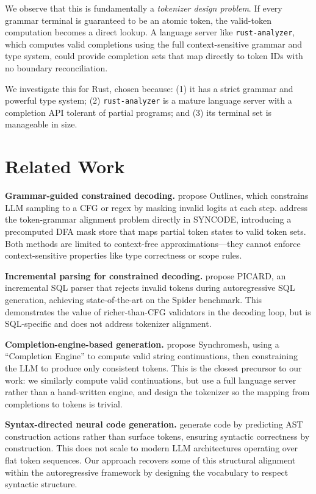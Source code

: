 \documentclass[11pt,letterpaper]{article}
\begin{document}
We observe that this is fundamentally a \emph{tokenizer design problem}. If every grammar terminal is guaranteed to be an atomic token, the valid-token computation becomes a direct lookup. A language server like \texttt{rust-analyzer}, which computes valid completions using the full context-sensitive grammar and type system, could provide completion sets that map directly to token IDs with no boundary reconciliation.

We investigate this for Rust, chosen because: (1) it has a strict grammar and powerful type system; (2) \texttt{rust-analyzer} is a mature language server with a completion API tolerant of partial programs; and (3) its terminal set is manageable in size.

\section{Related Work}

\textbf{Grammar-guided constrained decoding.}
\citet{willard2023outlines} propose Outlines, which constrains LLM sampling to a CFG or regex by masking invalid logits at each step. \citet{ugare2024syncode} address the token-grammar alignment problem directly in SYNCODE, introducing a precomputed DFA mask store that maps partial token states to valid token sets. Both methods are limited to context-free approximations---they cannot enforce context-sensitive properties like type correctness or scope rules.

\textbf{Incremental parsing for constrained decoding.}
\citet{scholak2021picard} propose PICARD, an incremental SQL parser that rejects invalid tokens during autoregressive SQL generation, achieving state-of-the-art on the Spider benchmark. This demonstrates the value of richer-than-CFG validators in the decoding loop, but is SQL-specific and does not address tokenizer alignment.

\textbf{Completion-engine-based generation.}
\citet{poesia2022synchromesh} propose Synchromesh, using a ``Completion Engine'' to compute valid string continuations, then constraining the LLM to produce only consistent tokens. This is the closest precursor to our work: we similarly compute valid continuations, but use a full language server rather than a hand-written engine, and design the tokenizer so the mapping from completions to tokens is trivial.

\textbf{Syntax-directed neural code generation.}
\citet{yin2017syntactic} generate code by predicting AST construction actions rather than surface tokens, ensuring syntactic correctness by construction. This does not scale to modern LLM architectures operating over flat token sequences. Our approach recovers some of this structural alignment within the autoregressive framework by designing the vocabulary to respect syntactic structure.
\end{document}
